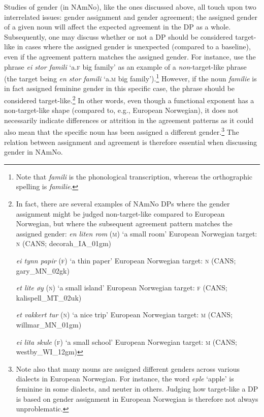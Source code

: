 \documentclass[output=paper]{langscibook}
\begin{document}
Studies of gender (in NAmNo), like the ones discussed above, all touch upon two interrelated issues: gender assignment and gender agreement; the assigned gender of a given noun will affect the expected agreement in the DP as a whole. Subsequently, one may discuss whether or not a DP should be considered target-like in cases where the assigned gender is unexpected (compared to a baseline), even if the agreement pattern matches the assigned gender. For instance, \citet{JohannessenLarsson2015} use the phrase \textit{ei stor famili} ‘a.\textsc{f} big family’ as an example of a \textit{non}{}-target-like phrase (the target being \textit{en stor famili} ‘a.\textsc{m} big family’).\footnote{Note that \emph{famili} is the phonological transcription, whereas the orthographic spelling is \emph{familie}.} However, if the noun \textit{familie} is in fact assigned feminine gender in this specific case, the phrase should be considered target-like.\footnote{In fact, there are several examples of NAmNo DPs where the gender assignment might be judged non-target-like compared to European Norwegian, but where the subsequent agreement pattern matches the assigned gender:
\ea \textit{en liten rom} ({\textsc{m}}{) ‘a small room’ European Norwegian target:} {\textsc{n}} {(CANS; decorah\_IA\_01gm)}

\ex \textit{ei tynn papir} ({\textsc{f}}{) ‘a thin paper’}{ }{European Norwegian target:} {\textsc{n}} {(CANS; gary\_MN\_02gk)}

\ex \textit{et lite øy} ({\textsc{n}}{) ‘a small island’}{ }{European Norwegian target:} {\textsc{f}} {(CANS; kalispell\_MT\_02uk)}

\ex \textit{et vakkert tur} ({\textsc{n}}){ }{‘a nice trip’   European Norwegian target:} {\textsc{m}} {(CANS; willmar\_MN\_01gm)}

\ex \textit{ei lita skule} ({\textsc{f}}{) ‘a small school’}{ }{European Norwegian target:} {\textsc{m}} {(CANS; westby\_WI\_12gm)}\z} 
In other words, even though a functional exponent has a non-target-like shape (compared to, e.g., European Norwegian), it does not necessarily indicate differences or attrition in the agreement patterns as it could also mean that the specific noun has been assigned a different gender.\footnote{ \textrm{Note also that many nouns are assigned different genders across various dialects in European Norwegian. For instance, the word} \textrm{\textit{eple} }\textrm{‘apple’ is feminine in some dialects, and neuter in others. Judging how target-like a DP is based on gender assignment in European Norwegian is therefore not always unproblematic.} } The relation between assignment and agreement is therefore essential when discussing gender in NAmNo.\largerpage
\end{document}

